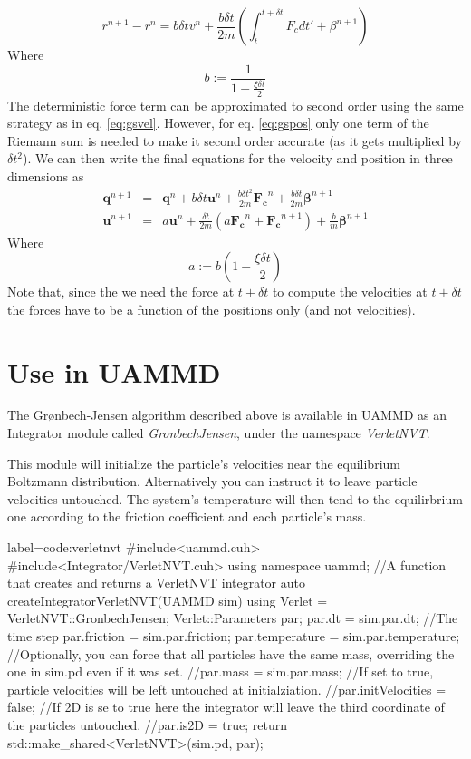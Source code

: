 \documentclass[ twoside,openright,titlepage,numbers=noenddot,%
headinclude,footinclude,cleardoublepage=empty,abstract=on,
BCOR=5mm,paper=a4,fontsize=11pt, dvipsnames
]{scrreprt}
\renewcommand{\vec}[1]{\bm{#1}}
\newcommand{\uammd}{\gls{UAMMD}\xspace}
\newcommand{\dt}{\delta t}
\newcommand{\ppos}{q}
\newcommand{\pvel}{u}
\begin{document}
\begin{equation}
  \label{eq:gspos}
  r^{n+1} - r^n =  b \dt v^n + \frac{b\dt}{2m}\left(\int_t^{t+\dt}F_cdt' + \beta^{n+1}\right)
\end{equation}
Where
\begin{equation}
b := \frac{1}{1+\frac{\xi\dt}{2}}
\end{equation}
The deterministic force term can be approximated to second order using the same strategy as in eq. \eqref{eq:gsvel}. However, for eq. \eqref{eq:gspos} only one term of the Riemann sum is needed to make it second order accurate (as it gets multiplied by $\dt^2$). We can then write the final equations for the velocity and position in three dimensions as
\begin{eqnarray}
  \label{eq:gsfinal}
  \vec{\ppos}^{n+1}  &=&  \vec{\ppos}^n + b \dt \vec{\pvel}^n + \frac{b\dt^2}{2m}\vec{F_c}^n + \frac{b\dt}{2m}\vec{\beta}^{n+1}\\
  \vec{\pvel}^{n+1} &=& a\vec{\pvel}^n + \frac{\dt}{2m}\left(a\vec{F_c}^n + \vec{F_c} ^{n+1}\right) +  \frac{b}{m}\vec{\beta}^{n+1}
\end{eqnarray}
Where
\begin{equation}
  a:=b \left(1-\frac{\xi\dt}{2}\right)
\end{equation}
Note that, since the we need the force at $t+\dt$ to compute the velocities at $t+\dt$ the forces have to be a function of the positions only (and not velocities).

\section*{Use in UAMMD}
The Grønbech-Jensen algorithm described above is available in \uammd as an Integrator module called \emph{GronbechJensen}, under the namespace \emph{VerletNVT}.

This module will initialize the particle's velocities near the equilibrium Boltzmann distribution.
Alternatively you can instruct it to leave particle velocities untouched. The system's temperature will then tend to the equilirbrium one according to the friction coefficient and each particle's mass.

\begin{code2}{label=code:verletnvt}
#include<uammd.cuh>
#include<Integrator/VerletNVT.cuh>
using namespace uammd;
//A function that creates and returns a VerletNVT integrator
auto createIntegratorVerletNVT(UAMMD sim){
  using Verlet = VerletNVT::GronbechJensen;
  Verlet::Parameters par;
  par.dt = sim.par.dt; //The time step
  par.friction = sim.par.friction;
  par.temperature = sim.par.temperature; 
  //Optionally, you can force that all particles have the same mass, overriding the one in sim.pd even if it was set.
  //par.mass = sim.par.mass;
  //If set to true, particle velocities will be left untouched at initialziation.
  //par.initVelocities = false;
  //If 2D is se to true here the integrator will leave the third coordinate of the particles untouched.
  //par.is2D = true;
  return std::make_shared<VerletNVT>(sim.pd, par);
}
\end{code2}
\end{document}
